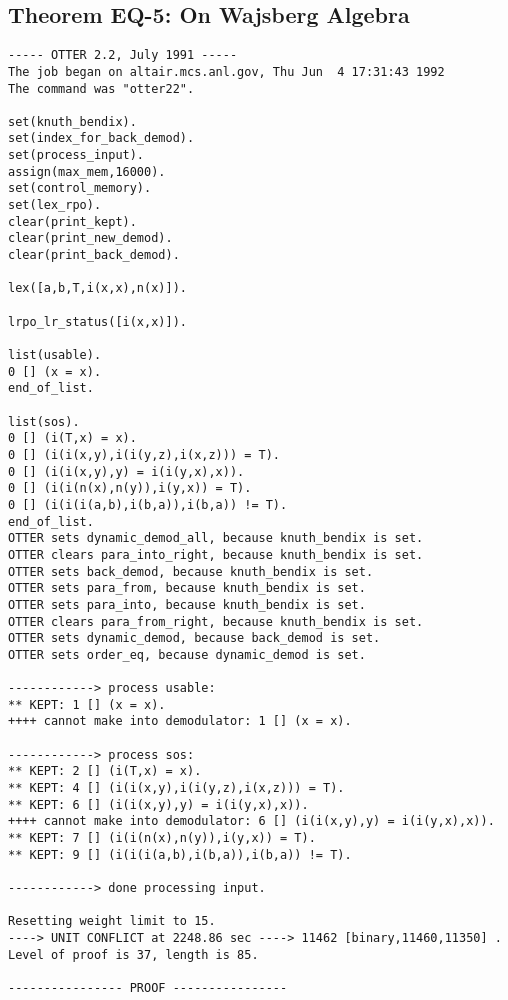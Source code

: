 \subsection{Theorem EQ-5: On Wajsberg Algebra}
{\small \begin{verbatim}
----- OTTER 2.2, July 1991 -----
The job began on altair.mcs.anl.gov, Thu Jun  4 17:31:43 1992
The command was "otter22".

set(knuth_bendix).
set(index_for_back_demod).
set(process_input).
assign(max_mem,16000).
set(control_memory).
set(lex_rpo).
clear(print_kept).
clear(print_new_demod).
clear(print_back_demod).

lex([a,b,T,i(x,x),n(x)]).

lrpo_lr_status([i(x,x)]).

list(usable).
0 [] (x = x).
end_of_list.

list(sos).
0 [] (i(T,x) = x).
0 [] (i(i(x,y),i(i(y,z),i(x,z))) = T).
0 [] (i(i(x,y),y) = i(i(y,x),x)).
0 [] (i(i(n(x),n(y)),i(y,x)) = T).
0 [] (i(i(i(a,b),i(b,a)),i(b,a)) != T).
end_of_list.
OTTER sets dynamic_demod_all, because knuth_bendix is set.
OTTER clears para_into_right, because knuth_bendix is set.
OTTER sets back_demod, because knuth_bendix is set.
OTTER sets para_from, because knuth_bendix is set.
OTTER sets para_into, because knuth_bendix is set.
OTTER clears para_from_right, because knuth_bendix is set.
OTTER sets dynamic_demod, because back_demod is set.
OTTER sets order_eq, because dynamic_demod is set.

------------> process usable:
** KEPT: 1 [] (x = x).
++++ cannot make into demodulator: 1 [] (x = x).

------------> process sos:
** KEPT: 2 [] (i(T,x) = x).
** KEPT: 4 [] (i(i(x,y),i(i(y,z),i(x,z))) = T).
** KEPT: 6 [] (i(i(x,y),y) = i(i(y,x),x)).
++++ cannot make into demodulator: 6 [] (i(i(x,y),y) = i(i(y,x),x)).
** KEPT: 7 [] (i(i(n(x),n(y)),i(y,x)) = T).
** KEPT: 9 [] (i(i(i(a,b),i(b,a)),i(b,a)) != T).

------------> done processing input.

Resetting weight limit to 15.
----> UNIT CONFLICT at 2248.86 sec ----> 11462 [binary,11460,11350] .
Level of proof is 37, length is 85.

---------------- PROOF ----------------


\end{verbatim}}
